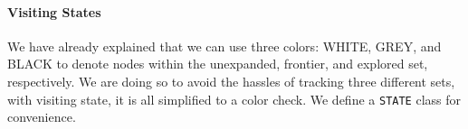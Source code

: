\documentclass[main.tex]{subfiles}
\begin{document}
\paragraph{Visiting States} 
We have already explained that we can use three colors: WHITE, GREY, and BLACK to denote nodes within the unexpanded, frontier, and explored set, respectively. We are doing so to avoid the hassles of tracking three different sets, with visiting state, it is all simplified to a color check. We define a \texttt{STATE} class for convenience.
\end{document}
